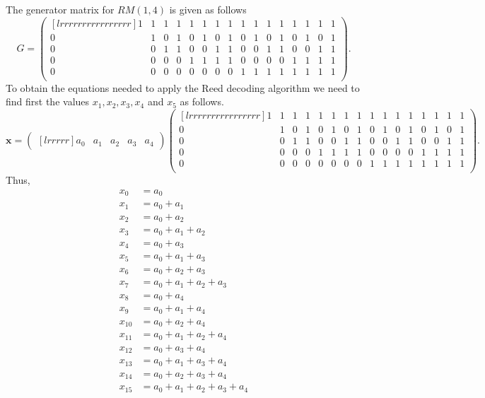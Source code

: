 The generator matrix for $RM(1, 4)$ is given as  follows
\[
G = 
\begin{pmatrix}[lrrrrrrrrrrrrrrrr]
1 &1 &1 &1 &1 &1 &1 &1 &1 &1 &1 &1 &1 &1 &1 &1 \\
0 &1 &0 &1 &0 &1 &0 &1 &0 &1 &0 &1 &0 &1 &0 &1 \\
0 &0 &1 &1 &0 &0 &1 &1 &0 &0 &1 &1 &0 &0 &1 &1 \\
0 &0 &0 &0 &1 &1 &1 &1 &0 &0 &0 &0 &1 &1 &1 &1 \\
0 &0 &0 &0 &0 &0 &0 &0 &1 &1 &1 &1 &1 &1 &1 &1 \\
\end{pmatrix}.
\]
To obtain the equations needed to apply the Reed decoding algorithm we need to find first the values $x_1, x_2, x_3, x_4$ and $x_5$ as follows.
\[
	\bm{x}=
	\begin{pmatrix}[lrrrrr]
	a_0 & a_1 & a_2 & a_3 & a_4 
	\end{pmatrix}
	\begin{pmatrix}[lrrrrrrrrrrrrrrrr]
     1 &1 &1 &1 &1 &1 &1 &1 &1 &1 &1 &1 &1 &1 &1 &1 \\
     0 &1 &0 &1 &0 &1 &0 &1 &0 &1 &0 &1 &0 &1 &0 &1 \\
     0 &0 &1 &1 &0 &0 &1 &1 &0 &0 &1 &1 &0 &0 &1 &1 \\
     0 &0 &0 &0 &1 &1 &1 &1 &0 &0 &0 &0 &1 &1 &1 &1 \\
     0 &0 &0 &0 &0 &0 &0 &0 &1 &1 &1 &1 &1 &1 &1 &1 \\
    \end{pmatrix}.
\]
Thus,
\begin{align}
\label{eq:3.1}
	x_0 &= a_0\\
	\label{eq:3.2}
	x_1 &= a_0 + a_1\\
	\label{eq:3.3}
	x_2 &= a_0 + a_2\\
	\label{eq:3.4}
	x_3 &= a_0 + a_1 + a_2\\
	\label{eq:3.5}
	x_4 &= a_0 + a_3\\
	\label{eq:3.6}
	x_5 &= a_0 + a_1 + a_3\\
	\label{eq:3.7}
	x_6 &= a_0 + a_2 + a_3\\
	\label{eq:3.8}
	x_7 &= a_0 + a_1 + a_2 + a_3\\
	\label{eq:3.9}
	x_8 &= a_0 + a_4\\
	\label{eq:3.10}
	x_9 &= a_0 + a_1 + a_4\\
	\label{eq:3.11}
	x_{10} &= a_0 + a_2 + a_4\\
	\label{eq:3.12}
	x_{11} &= a_0 + a_1 + a_2 + a_4\\
	\label{eq:3.13}
	x_{12} &= a_0 + a_3 + a_4\\
	\label{eq:3.14}
	x_{13} &= a_0 + a_1 + a_3 +a_4\\
	\label{eq:3.14}
	x_{14} &= a_0 + a_2 +a_3 + a_4\\
	\label{eq:3.16}
	x_{15} &= a_0 + a_1 + a_2 + a_3 + a_4
\end{align}

